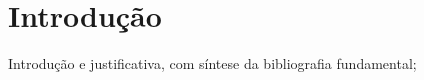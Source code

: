 \chapter[Introdução]{Introdução}\label{Introdução}

Introdução e justificativa, com síntese da bibliografia fundamental;







  

  
